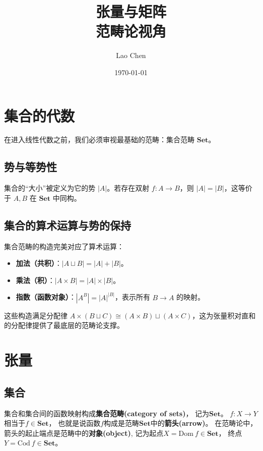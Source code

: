 \documentclass[10pt, openany]{book}
\begin{document}
\frontmatter
\title{\textbf{张量与矩阵}\\ \large 范畴论视角}
\author{Lao Chen}
\date{\today}
\maketitle
\tableofcontents

\mainmatter

\chapter{集合的代数}
在进入线性代数之前，我们必须审视最基础的范畴：集合范畴 $\mathbf{Set}$。

\section{势与等势性}
集合的“大小”被定义为它的势 $|A|$。若存在双射 $f: A \to B$，则 $|A| = |B|$，这等价于 $A, B$ 在 $\mathbf{Set}$ 中同构。

\section{集合的算术运算与势的保持}
集合范畴的构造完美对应了算术运算：
\begin{itemize}
    \item \textbf{加法（共积）}：$|A \sqcup B| = |A| + |B|$。
    \item \textbf{乘法（积）}：$|A \times B| = |A| \times |B|$。
    \item \textbf{指数（函数对象）}：$|A^B| = |A|^{|B|}$，表示所有 $B \to A$ 的映射。
\end{itemize}
这些构造满足分配律 $A \times (B \sqcup C) \cong (A \times B) \sqcup (A \times C)$，这为张量积对直和的分配律提供了最底层的范畴论支撑。


\chapter{张量}

\section{集合}

集合和集合间的函数映射构成\textbf{集合范畴(category of sets)}，
记为$\textbf{Set}$。
$f:X \to Y$相当于$f\in\textbf{Set}$，
也就是说函数$f$构成是范畴$\textbf{Set}$中的\textbf{箭头(arrow)}。
在范畴论中，
箭头的起止端点是范畴中的\textbf{对象(object)},
记为起点$X = \text{Dom} \ f \in \textbf{Set}$，
终点$Y = \text{Cod} \ f \in \textbf{Set}$。
\end{document}
